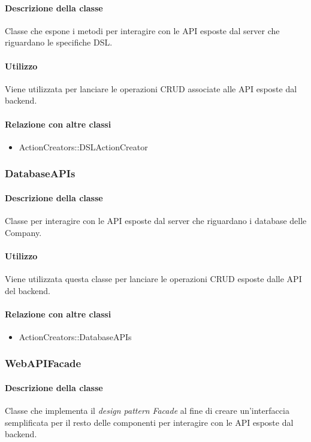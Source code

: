 \paragraph*{Descrizione della classe}
Classe che espone i metodi per interagire con le API esposte dal server che riguardano le specifiche DSL.

\paragraph*{Utilizzo}
Viene utilizzata per lanciare le operazioni CRUD associate alle API esposte dal backend.

\paragraph*{Relazione con altre classi}
\begin{itemize}
\item ActionCreators::DSLActionCreator
\end{itemize}

\subsubsection{DatabaseAPIs}
\paragraph*{Descrizione della classe}
Classe per interagire con le API esposte dal server che riguardano i database delle Company.

\paragraph*{Utilizzo}
Viene utilizzata questa classe per lanciare le operazioni CRUD esposte dalle API del backend.

\paragraph*{Relazione con altre classi}
\begin{itemize}
\item ActionCreators::DatabaseAPIs
\end{itemize}

\subsubsection{WebAPIFacade}
\paragraph*{Descrizione della classe}
Classe che implementa il \textit{design pattern} \textit{Facade} al fine di creare un'interfaccia semplificata per il resto delle componenti per interagire con le API esposte dal backend.
